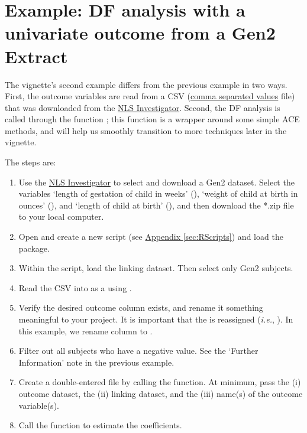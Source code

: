 \documentclass[letterpaper]{article}\usepackage{graphicx, color}
\begin{document}
\section{Example: DF analysis with a univariate outcome from a Gen2 Extract}
The vignette's second example differs from the previous example in two ways.  First, the outcome variables are read from a CSV (\href{http://en.wikipedia.org/wiki/Comma-separated_values}{comma separated values} file) that was downloaded from the \hyperref[term:NlsInvestigator]{NLS Investigator}.  Second, the DF analysis is called through the function ; this function is a wrapper around some simple ACE methods, and will help us smoothly transition to more techniques later in the vignette.   

The steps are:
\begin{enumerate}
\item Use the \hyperref[term:NlsInvestigator]{NLS Investigator} to select and download a Gen2 dataset.  Select the variables `length of gestation of child in weeks' (), `weight of child at birth in ounces' (), and `length of child at birth' (), and then download the *.zip file to your local computer.

\item Open \R{} and create a new script (see \hyperref[sec:RScripts]{Appendix \ref*{sec:RScripts}}) and load the  package.
\item Within the \R{} script, load the linking dataset.  Then select only Gen2 subjects.
\item Read the CSV into \R{} as a  using .
\item Verify the desired outcome column exists, and rename it something meaningful to your project.  It is important that the  is reassigned (\emph{i.e.}, ).  In this example, we rename column  to .
\item Filter out all subjects who have a negative  value.  See the `Further Information' note in the previous example.
\item Create a double-entered file by calling the  function.  At minimum, pass the (i) outcome dataset, the (ii) linking dataset, and the (iii) name(s) of the outcome variable(s). 
\item Call the  function to estimate the coefficients.
\end{enumerate}
\end{document}
